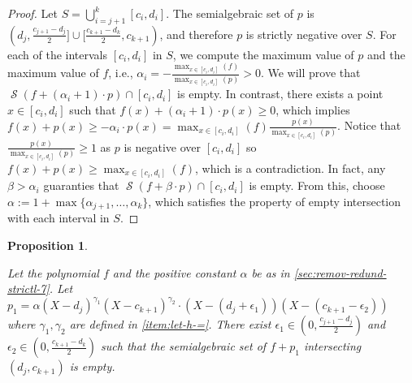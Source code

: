 \documentclass[preprint,12pt,authoryear]{elsarticle}
\newtheorem{proposition}[theorem]{Proposition}
\newtheorem{proof}[theorem]{Proof}
\DeclareMathOperator{\semialgebraic}{\mathcal{S}}
\begin{document}
\begin{proof}
  Let $S = \bigcup_{i=j+1}^{k}{[c_i, d_i]}$. The semialgebraic set of $p$ is
  $(d_j, \frac{c_{j+1} - d_j}{2}] \cup [\frac{c_{k+1} - d_k}{2}, c_{k+1})$,
 and therefore $p$ is strictly negative over $S$. For each of the intervals
  $[c_i, d_i]$ in $S$, we compute the maximum value of $p$ and the maximum value of
  $f$, i.e.,
 $\alpha_i = -\frac{\max_{x \in [c_i, d_i]}(f)}{\max_{x \in [c_i, d_i]}(p)} >
  0$. We will prove that $\semialgebraic(f + (\alpha_i + 1) \cdot p) \cap [c_i, d_i]$
 is empty. In contrast, there exists a point $x \in [c_i, d_i]$ such that
  $f(x) + (\alpha_i + 1) \cdot p(x) \geq 0$, which implies
  $f(x) + p(x) \geq - \alpha_i \cdot p(x) = \max_{x \in [c_i, d_i]}(f)
  \frac{p(x)}{\max_{x \in [c_i, d_i]}(p)}$. Notice that
  $\frac{p(x)}{\max_{x \in [c_i, d_i]}(p)} \geq 1$ as $p$ is negative over
  $[c_i, d_i]$ so $f(x) + p(x) \geq \max_{x \in [c_i, d_i]}(f)$, which is a
  contradiction. In fact, any $\beta > \alpha_i$ guaranties that
  $\semialgebraic(f + \beta \cdot p) \cap [c_i, d_i]$ is empty. From this,
  choose $\alpha := 1 + \max\{\alpha_{j+1}, \dots, \alpha_k\}$, which satisfies
  the property of empty intersection with each interval in $S$.
\end{proof}

\begin{proposition}
  \th\label{sec:remov-redund-strictl-5}





  Let the polynomial $f$ and the positive constant $\alpha$ be as in
  \th\ref{sec:remov-redund-strictl-7}. Let
  $p_1 = \alpha (X - d_j)^{\gamma_1}(X - c_{k+1})^{\gamma_2} \cdot (X - (d_j +
  \epsilon_1))(X - (c_{k+1} - \epsilon_2))$ where $\gamma_1, \gamma_2$ are
  defined in \eqref{item:let-h-=}. There exist
  $\epsilon_1 \in (0, \frac{c_{j+1} - d_j}{2})$ and
  $\epsilon_2 \in (0, \frac{c_{k+1} - d_k}{2})$ such that the semialgebraic set
  of $f + p_1$ intersecting $(d_j, c_{k+1})$ is empty.
\end{proposition}
\end{document}
